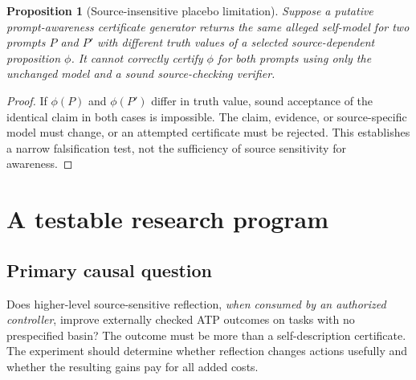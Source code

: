 \documentclass[11pt,letterpaper]{article}
\newtheorem{proposition}[definition]{Proposition}
\begin{document}
\begin{proposition}[Source-insensitive placebo limitation]
Suppose a putative prompt-awareness certificate generator returns the same alleged self-model for two prompts $P$ and $P'$ with different truth values of a selected source-dependent proposition $\phi$. It cannot correctly certify $\phi$ for \emph{both} prompts using only the unchanged model and a sound source-checking verifier.
\end{proposition}
\begin{proof}
If $\phi(P)$ and $\phi(P')$ differ in truth value, sound acceptance of the identical claim in both cases is impossible. The claim, evidence, or source-specific model must change, or an attempted certificate must be rejected. This establishes a narrow falsification test, not the sufficiency of source sensitivity for awareness.
\end{proof}

\section{A testable research program}
\subsection{Primary causal question}
Does higher-level source-sensitive reflection, \emph{when consumed by an authorized controller}, improve externally checked ATP outcomes on tasks with no prespecified basin? The outcome must be more than a self-description certificate. The experiment should determine whether reflection changes actions usefully and whether the resulting gains pay for all added costs.
\end{document}
